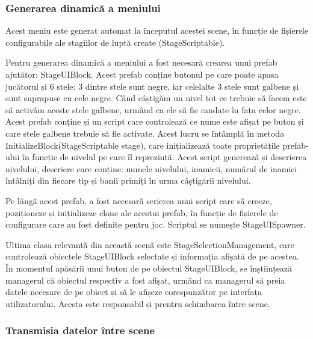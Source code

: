 \documentclass[12pt, a4paper]{article}
\begin{document}
	\subsubsection{Generarea dinamică a meniului}
	
	Acest meniu este generat automat la începutul acestei scene, în funcție de fișierele configurabile ale stagiilor de luptă create (StageScriptable).
	\newline
	
	Pentru generarea dinamică a meniului a fost necesară crearea unui prefab ajutător: StageUIBlock. Acest prefab conține butonul pe care poate apasa jucătorul și 6 stele: 3 dintre stele sunt negre, iar celelalte 3 stele sunt galbene și sunt suprapuse cu cele negre. Când câștigăm un nivel tot ce trebuie să facem este să activăm aceste stele galbene, urmând ca ele să fie randate în fața celor negre. Acest prefab conține și un script care controlează ce nume este afișat pe buton și care stele galbene trebuie să fie activate. Acest lucru se întâmplă în metoda InitializeBlock(StageScriptable stage), care inițializează toate proprietățile prefab-ului în funcție de nivelul pe care îl reprezintă. Acest script generează și descrierea nivelului, descriere care conține: numele nivelului, inamicii, numărul de inamici întâlniți din fiecare tip și banii primiți în urma câștigării nivelului.
	\newline
	
	Pe lângă acest prefab, a fost necesară scrierea unui script care să creeze, poziționeze și inițializeze clone ale acestui prefab, în funcție de fișierele de configurare care au fost definite pentru joc. Scriptul se numește StageUISpawner.
	\newline
	
	Ultima clasa relevantă din această scenă este StageSelectionManagement, care controlează obiectele StageUIBlock selectate și informația afișată de pe acestea. În momentul apăsării unui buton de pe obiectul StageUIBlock, se înștiințează managerul că obiectul respectiv a fost afișat, urmând ca managerul să preia datele necesare de pe obiect și să le afișeze corespunzător pe interfața utilizatorului. Acesta este responsabil și prentru schimbarea între scene.
	
	
	
	
	
	\subsubsection{Transmisia datelor între scene}
	\label{section: dataBetweenScenes}
	
\end{document}
